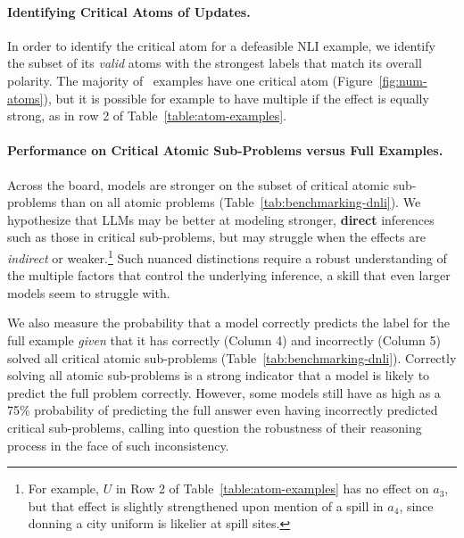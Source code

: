 \paragraph{Identifying Critical Atoms of Updates.} In order to identify the critical atom for a defeasible NLI example, we identify the subset of its \textit{valid} atoms with the strongest labels that match its overall polarity.
%
The majority of \dsnlitest~examples have one critical atom (Figure~\ref{fig:num-atoms}), but it is possible for example to have multiple if the effect is equally strong, as in row 2 of Table~\ref{table:atom-examples}.

\paragraph{Performance on Critical Atomic Sub-Problems versus Full Examples.}
Across the board, models are stronger on the subset of critical atomic sub-problems than on all atomic problems (Table~\ref{tab:benchmarking-dnli}). 
%
We hypothesize that LLMs may be better at modeling stronger, \textbf{direct} inferences such as those in critical sub-problems, but may struggle when the effects are \textit{indirect} or weaker.\footnote{For example, $U$ in Row 2 of Table~\ref{table:atom-examples} has no effect on $a_3$, but that effect is slightly strengthened upon mention of a spill in $a_4$, since donning a city uniform is likelier at spill sites.}
%
%
Such nuanced distinctions require a robust understanding of the multiple factors that control the underlying inference, a skill that even larger models seem to struggle with.

We also measure the probability that a model correctly predicts the label for the full example \textit{given} that it has correctly (Column 4) and incorrectly (Column 5) solved all critical atomic sub-problems (Table~\ref{tab:benchmarking-dnli}).
%
Correctly solving all atomic sub-problems is a strong indicator that a model is likely to predict the full problem correctly.
%
However, some models still have as high as a 75\% probability of predicting the full answer even having incorrectly predicted critical sub-problems, calling into question the robustness of their reasoning process in the face of such inconsistency.
